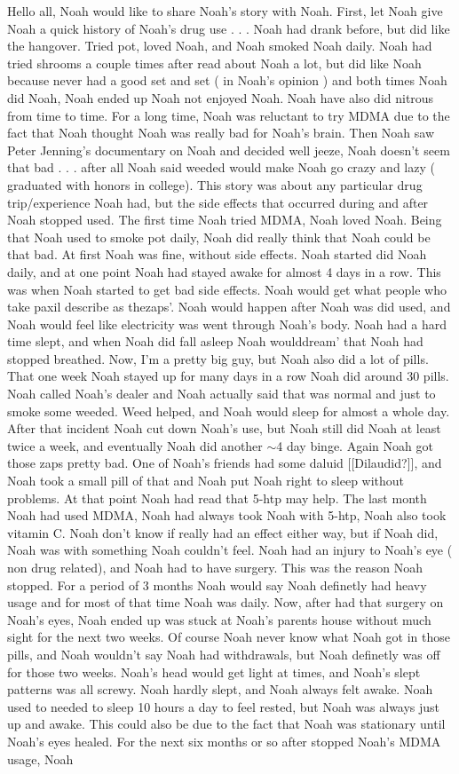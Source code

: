 \documentclass[12pt]{book}
\begin{document}
Hello all, Noah would like to share Noah's story with Noah. First, let Noah give Noah a quick history of Noah's drug use . . .  Noah had drank before, but did like the hangover. Tried pot, loved Noah, and Noah smoked Noah daily. Noah had tried shrooms a couple times after read about Noah a lot, but did like Noah because never had a good set and set ( in Noah's opinion ) and both times Noah did Noah, Noah ended up Noah not enjoyed Noah. Noah have also did nitrous from time to time. For a long time, Noah was reluctant to try MDMA due to the fact that Noah thought Noah was really bad for Noah's brain. Then Noah saw Peter Jenning's documentary on Noah and decided well jeeze, Noah doesn't seem that bad . . .  after all Noah said weeded would make Noah go crazy and lazy ( graduated with honors in college). This story was about any particular drug trip/experience Noah had, but the side effects that occurred during and after Noah stopped used. The first time Noah tried MDMA, Noah loved Noah. Being that Noah used to smoke pot daily, Noah did really think that Noah could be that bad. At first Noah was fine, without side effects. Noah started did Noah daily, and at one point Noah had stayed awake for almost 4 days in a row. This was when Noah started to get bad side effects. Noah would get what people who take paxil describe as thezaps'. Noah would happen after Noah was did used, and Noah would feel like electricity was went through Noah's body. Noah had a hard time slept, and when Noah did fall asleep Noah woulddream' that Noah had stopped breathed. Now, I'm a pretty big guy, but Noah also did a lot of pills. That one week Noah stayed up for many days in a row Noah did around 30 pills. Noah called Noah's dealer and Noah actually said that was normal and just to smoke some weeded. Weed helped, and Noah would sleep for almost a whole day. After that incident Noah cut down Noah's use, but Noah still did Noah at least twice a week, and eventually Noah did another $\sim$4 day binge. Again Noah got those zaps pretty bad. One of Noah's friends had some daluid [[Dilaudid?]], and Noah took a small pill of that and Noah put Noah right to sleep without problems. At that point Noah had read that 5-htp may help. The last month Noah had used MDMA, Noah had always took Noah with 5-htp, Noah also took vitamin C. Noah don't know if really had an effect either way, but if Noah did, Noah was with something Noah couldn't feel. Noah had an injury to Noah's eye ( non drug related), and Noah had to have surgery. This was the reason Noah stopped. For a period of 3 months Noah would say Noah definetly had heavy usage and for most of that time Noah was daily. Now, after had that surgery on Noah's eyes, Noah ended up was stuck at Noah's parents house without much sight for the next two weeks. Of course Noah never know what Noah got in those pills, and Noah wouldn't say Noah had withdrawals, but Noah definetly was off for those two weeks. Noah's head would get light at times, and Noah's slept patterns was all screwy. Noah hardly slept, and Noah always felt awake. Noah used to needed to sleep 10 hours a day to feel rested, but Noah was always just up and awake. This could also be due to the fact that Noah was stationary until Noah's eyes healed. For the next six months or so after stopped Noah's MDMA usage, Noah 
\end{document}
